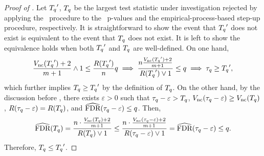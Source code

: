 \begin{proof}[Proof of ]

Let ${T_{q}}'$, ${T_{q}}$ be the largest test statistic under investigation rejected by applying the \BH~procedure to the \nickname~p-values and the empirical-process-based step-up procedure, respectively.
It is straightforward to show the event that ${T_{q}}'$ does not exist is equivalent to  the event that ${T_{q}}$ does not exist.
It is left to show the equivalence holds when both ${T_{q}}'$ and ${T_{q}}$ are well-defined.
On one hand,
\begin{align*}
    \frac{V_{\text{nc}}({T_{q}}')+2}{m+1}  \wedge 1 \le \frac{R({T_{q}}')}{{n}} q
    \implies
    \frac{{n}\frac{V_{\text{nc}}({T_{q}}')+2}{m+1}}{R({T_{q}}') \vee 1} \le q
    \implies {\tau_q} \ge {T_{q}}',
\end{align*}
which further implies ${T_{q}} \ge {T_{q}}'$ by the definition of ${T_{q}}$.
On the other hand, by the discussion before ,
there exists $\varepsilon > 0$ such that ${\tau_q} - \varepsilon > {T_{q}}$, $V_{\text{nc}}({\tau_q} - \varepsilon) \ge V_{\text{nc}}({T_{q}})$,
$R({\tau_q} - \varepsilon) = R({T_{q}})$,
and $\widehat{\text{FDR}}({\tau_q} - \varepsilon) \le q$.
Then,
\begin{align*}
    \widehat{\text{FDR}}({T_{q}})
    = \frac{{n} \cdot \frac{V_{\text{nc}}({T_{q}})+2}{m+1} }{R({T_{q}}) \vee 1}
    \le \frac{{n} \cdot \frac{V_{\text{nc}}({\tau_q} - \varepsilon)+2}{m+1} }{R({\tau_q} - \varepsilon) \vee 1}
    = \widehat{\text{FDR}}({\tau_q} - \varepsilon)
    \le q.
\end{align*}
Therefore,  ${T_{q}} \le {T_{q}}'$.

\end{proof}



